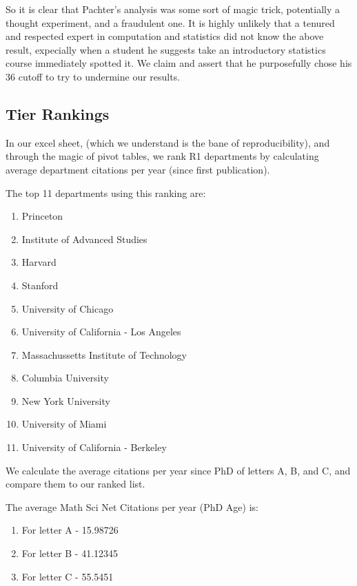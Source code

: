 \documentclass[]{article}
\begin{document}
So it is clear that Pachter's analysis was some sort of magic trick,
potentially a thought experiment, and a fraudulent one. It is highly
unlikely that a tenured and respected expert in computation and
statistics did not know the above result, expecially when a student he
suggests take an introductory statistics course immediately spotted it.
We claim and assert that he purposefully chose his 36 cutoff to try to
undermine our results.

\hypertarget{tier-rankings}{%
\subsection{Tier Rankings}\label{tier-rankings}}

In our excel sheet, (which we understand is the bane of
reproducibility), and through the magic of pivot tables, we rank R1
departments by calculating average department citations per year (since
first publication).

The top 11 departments using this ranking are:

\begin{enumerate}
\def\labelenumi{\arabic{enumi}.}
\item
  Princeton
\item
  Institute of Advanced Studies
\item
  Harvard
\item
  Stanford
\item
  University of Chicago
\item
  University of California - Los Angeles
\item
  Massachussetts Institute of Technology
\item
  Columbia University
\item
  New York University
\item
  University of Miami
\item
  University of California - Berkeley
\end{enumerate}

We calculate the average citations per year since PhD of letters A, B,
and C, and compare them to our ranked list.

The average Math Sci Net Citations per year (PhD Age) is:

\begin{enumerate}
\def\labelenumi{\arabic{enumi}.}
\item
  For letter A - 15.98726
\item
  For letter B - 41.12345
\item
  For letter C - 55.5451
\end{enumerate}
\end{document}
